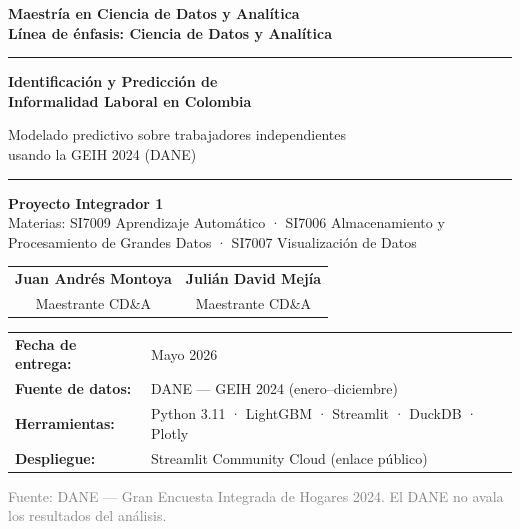 \documentclass[12pt, a4paper]{article}
\begin{document}
\begin{titlepage}
  \thispagestyle{empty}
  \begin{center}
    \vspace*{1cm}

    {\Large\bfseries\color{azulDane}
      Maestría en Ciencia de Datos y Analítica\\[0.3em]
      \normalsize Línea de énfasis: Ciencia de Datos y Analítica
    }

    \vspace{0.8cm}
    \rule{\textwidth}{1.5pt}
    \vspace{0.5cm}

    {\Huge\bfseries\color{azulDane}
      Identificación y Predicción de\\[0.3em]
      Informalidad Laboral en Colombia
    }

    \vspace{0.4cm}
    {\Large\color{azulClaro}
      Modelado predictivo sobre trabajadores independientes\\
      usando la GEIH 2024 (DANE)
    }

    \vspace{0.4cm}
    \rule{\textwidth}{0.4pt}

    \vspace{1.2cm}
    {\large\bfseries Proyecto Integrador 1}\\[0.3em]
    {\normalsize Materias: SI7009 Aprendizaje Automático · SI7006 Almacenamiento y
    Procesamiento de Grandes Datos · SI7007 Visualización de Datos}

    \vspace{1.5cm}
    \begin{tabular}{cc}
      \large\bfseries Juan Andrés Montoya & \large\bfseries Julián David Mejía\\[0.2em]
      \normalsize Maestrante CD\&A & \normalsize Maestrante CD\&A
    \end{tabular}

    \vfill

    \begin{tabular}{ll}
      \textbf{Fecha de entrega:} & Mayo 2026\\[0.2em]
      \textbf{Fuente de datos:} & DANE — GEIH 2024 (enero–diciembre)\\[0.2em]
      \textbf{Herramientas:} & Python 3.11 · LightGBM · Streamlit · DuckDB · Plotly\\[0.2em]
      \textbf{Despliegue:} & Streamlit Community Cloud (enlace público)\\
    \end{tabular}

    \vspace{0.8cm}
    {\small\textcolor{gray}{Fuente: DANE — Gran Encuesta Integrada de Hogares 2024.
    El DANE no avala los resultados del análisis.}}
  \end{center}
\end{titlepage}
\end{document}
